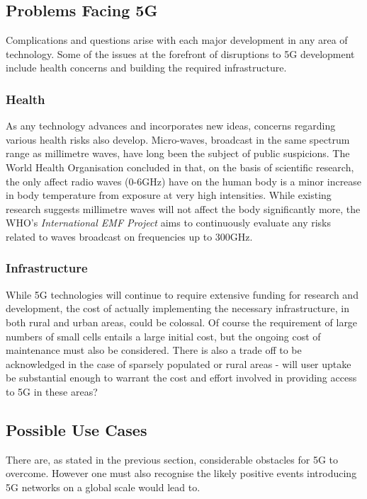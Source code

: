 \documentclass[journal]{IEEEtran}
\begin{document}
\subsection{Problems Facing 5G}
Complications and questions arise with each major development in any area of technology. Some of the issues at the forefront of disruptions to 5G development include health concerns and building the required infrastructure.

\subsubsection{Health}As any technology advances and incorporates new ideas, concerns regarding various health risks also develop. Micro-waves, broadcast in the same spectrum range as millimetre waves, have long been the subject of public suspicions. The World Health Organisation concluded in \cite{health} that, on the basis of scientific research, the only affect radio waves (0-6GHz) have on the human body is a minor increase in body temperature from exposure at very high intensities. While existing research suggests millimetre waves will not affect the body significantly more, the WHO's \textit{International EMF Project} \cite{emfproj} aims to continuously evaluate any risks related to waves broadcast on frequencies up to 300GHz.

\subsubsection{Infrastructure}While 5G technologies will continue to require extensive funding for research and development, the cost of actually implementing the necessary infrastructure, in both rural and urban areas, could be colossal. Of course the requirement of large numbers of small cells entails a large initial cost, but the ongoing cost of maintenance must also be considered. There is also a trade off to be acknowledged in the case of sparsely populated or rural areas - will user uptake be substantial enough to warrant the cost and effort involved in providing access to 5G in these areas? 

\subsection{Possible Use Cases}
There are, as stated in the previous section, considerable obstacles for 5G to overcome. However one must also recognise the likely positive events introducing 5G networks on a global scale would lead to.
\end{document}
